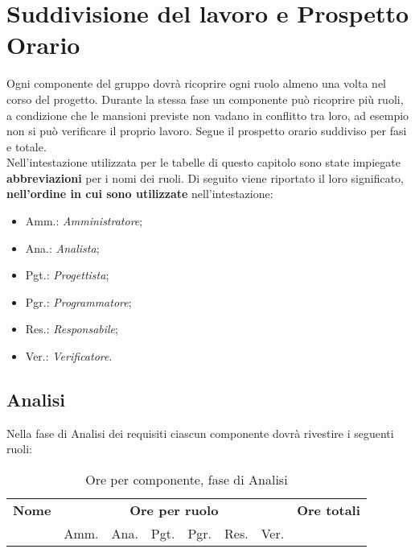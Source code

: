 
\section{Suddivisione del lavoro e Prospetto Orario} 


Ogni componente del gruppo dovrà ricoprire ogni ruolo almeno una volta nel corso del progetto.
Durante la stessa fase un componente può ricoprire più ruoli, a condizione che le mansioni previste non vadano in conflitto tra loro, ad esempio non si può verificare il proprio lavoro.
Segue il prospetto orario suddiviso per fasi e totale. \\

Nell'intestazione utilizzata per le tabelle di questo capitolo sono state impiegate \textbf{abbreviazioni} per i nomi dei ruoli.
Di seguito viene riportato il loro significato, \textbf{nell'ordine in cui sono utilizzate} nell'intestazione:
\begin{itemize}
\item Amm.: \textit{Amministratore};
\item Ana.: \textit{Analista};
\item Pgt.: \textit{Progettista};
\item Pgr.: \textit{Programmatore};
\item Res.: \textit{Responsabile};
\item Ver.: \textit{Verificatore}.
\end{itemize}

\pagebreak
\subsection{Analisi}

Nella fase di Analisi dei requisiti ciascun componente dovrà rivestire i seguenti ruoli:
\noindent
\begin{table}[H]
\begin{tabular}{lccccccc}
\toprule
    \textbf{Nome}  & \multicolumn{6}{c}{\textbf{Ore per ruolo}} & \textbf{Ore totali} \\
     & Amm. & Ana. & Pgt. & Pgr. & Res. & Ver. & \\
    \midrule
    
    	
    
    \bottomrule
\end{tabular}
\caption{Ore per componente, fase di Analisi}
\end{table}

